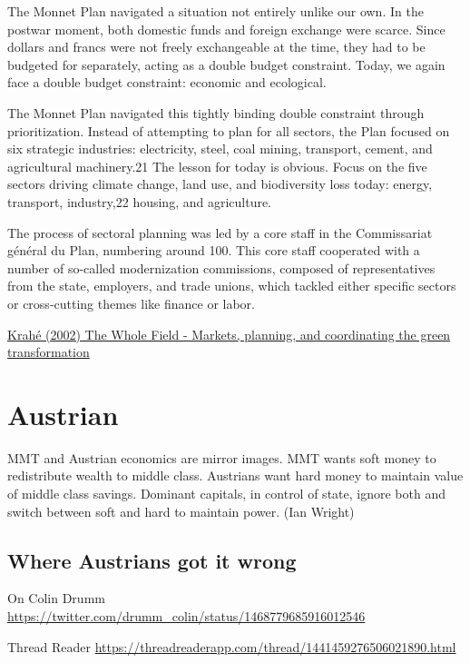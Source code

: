 \documentclass[
]{book}
\begin{document}
The Monnet Plan navigated a situation not entirely unlike our own. In the postwar moment, both domestic funds and foreign exchange were scarce. Since dollars and francs were not freely exchangeable at the time, they had to be budgeted for separately, acting as a double budget constraint. Today, we again face a double budget constraint: economic and ecological.

The Monnet Plan navigated this tightly binding double constraint through prioritization. Instead of attempting to plan for all sectors, the Plan focused on six strategic industries: electricity, steel, coal mining, transport, cement, and agricultural machinery.21 The lesson for today is obvious. Focus on the five sectors driving climate change, land use, and biodiversity loss today: energy, transport, industry,22 housing, and agriculture.

The process of sectoral planning was led by a core staff in the Commissariat général du Plan, numbering around 100. This core staff cooperated with a number of so-called modernization commissions, composed of representatives from the state, employers, and trade unions, which tackled either specific sectors or cross-cutting themes like finance or labor.

\href{https://www.phenomenalworld.org/analysis/climate-planning/}{Krahé (2002) The Whole Field - Markets, planning, and coordinating the green transformation}

\hypertarget{austrian}{%
\chapter{Austrian}\label{austrian}}

MMT and Austrian economics are mirror images. MMT wants soft money to redistribute wealth to middle class. Austrians want hard money to maintain value of middle class savings. Dominant capitals, in control of state, ignore both and switch between soft and hard to maintain power.
(Ian Wright)

\hypertarget{where-austrians-got-it-wrong}{%
\section{Where Austrians got it wrong}\label{where-austrians-got-it-wrong}}

On Colin Drumm
\url{https://twitter.com/drumm_colin/status/1468779685916012546}

Thread Reader
\url{https://threadreaderapp.com/thread/1441459276506021890.html}
\end{document}
